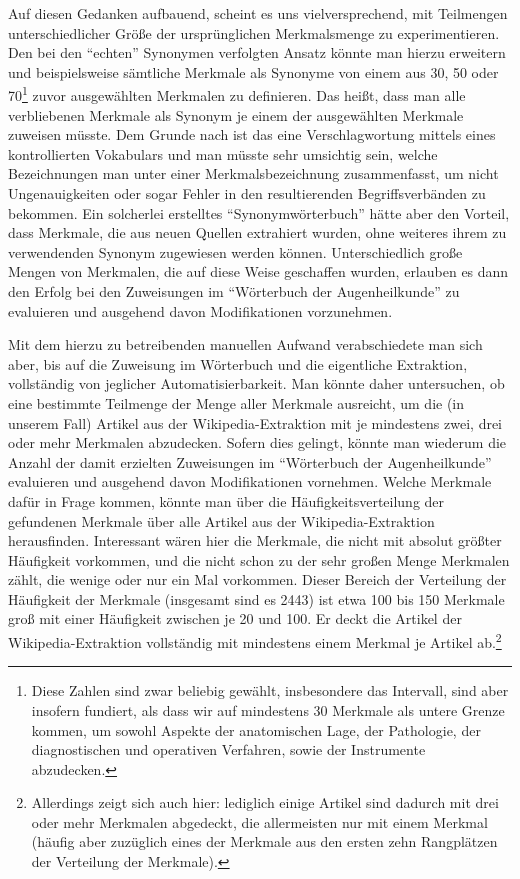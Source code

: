 \documentclass[pagesize,paper=A4,DIV=calc,fontsize=12pt,draft=false]{scrreprt}
\begin{document}
Auf diesen Gedanken aufbauend, scheint es uns vielversprechend, mit Teilmengen unterschiedlicher Größe der ursprünglichen Merkmalsmenge zu experimentieren.
Den bei den \enquote{echten} Synonymen verfolgten Ansatz könnte man hierzu erweitern und beispielsweise sämtliche Merkmale als Synonyme von einem aus 30, 50 oder 70\footnote{Diese Zahlen sind zwar beliebig gewählt, insbesondere das Intervall, sind aber insofern fundiert, als dass wir auf mindestens 30 Merkmale als untere Grenze kommen, um sowohl Aspekte der anatomischen Lage, der Pathologie, der diagnostischen und operativen Verfahren, sowie der Instrumente abzudecken.} zuvor ausgewählten Merkmalen zu definieren.
Das heißt, dass man alle verbliebenen Merkmale als Synonym je einem der ausgewählten Merkmale zuweisen müsste.
Dem Grunde nach ist das eine Verschlagwortung mittels eines kontrollierten Vokabulars und man müsste sehr umsichtig sein, welche Bezeichnungen man unter einer Merkmalsbezeichnung zusammenfasst, um nicht Ungenauigkeiten oder sogar Fehler in den resultierenden Begriffsverbänden zu bekommen.
Ein solcherlei erstelltes \enquote{Synonymwörterbuch} hätte aber den Vorteil, dass Merkmale, die aus neuen Quellen extrahiert wurden, ohne weiteres ihrem zu verwendenden Synonym zugewiesen werden können.
Unterschiedlich große Mengen von Merkmalen, die auf diese Weise geschaffen wurden, erlauben es dann den Erfolg bei den Zuweisungen im \enquote{Wörterbuch der Augenheilkunde} zu evaluieren und ausgehend davon Modifikationen vorzunehmen.

Mit dem hierzu zu betreibenden manuellen Aufwand verabschiedete man sich aber, bis auf die Zuweisung im Wörterbuch und die eigentliche Extraktion, vollständig von jeglicher Automatisierbarkeit.
Man könnte daher untersuchen, ob eine bestimmte Teilmenge der Menge aller Merkmale ausreicht, um die (in unserem Fall) Artikel aus der Wikipedia-Extraktion mit je mindestens zwei, drei oder mehr Merkmalen abzudecken.
Sofern dies gelingt, könnte man wiederum die Anzahl der damit erzielten Zuweisungen im \enquote{Wörterbuch der Augenheilkunde} evaluieren und ausgehend davon Modifikationen vornehmen.
Welche Merkmale dafür in Frage kommen, könnte man über die Häufigkeitsverteilung der gefundenen Merkmale über alle Artikel aus der Wikipedia-Extraktion herausfinden.
Interessant wären hier die Merkmale, die nicht mit absolut größter Häufigkeit vorkommen, und die nicht schon zu der sehr großen Menge Merkmalen zählt, die wenige oder nur ein Mal vorkommen.
Dieser Bereich der Verteilung der Häufigkeit der Merkmale (insgesamt sind es 2443) ist etwa 100 bis 150 Merkmale groß mit einer Häufigkeit zwischen je 20 und 100.
Er deckt die Artikel der Wikipedia-Extraktion vollständig mit mindestens einem Merkmal je Artikel ab.\footnote{Allerdings zeigt sich auch hier: lediglich einige Artikel sind dadurch mit drei oder mehr Merkmalen abgedeckt, die allermeisten nur mit einem Merkmal (häufig aber zuzüglich eines der Merkmale aus den ersten zehn Rangplätzen der Verteilung der Merkmale).}
\end{document}

